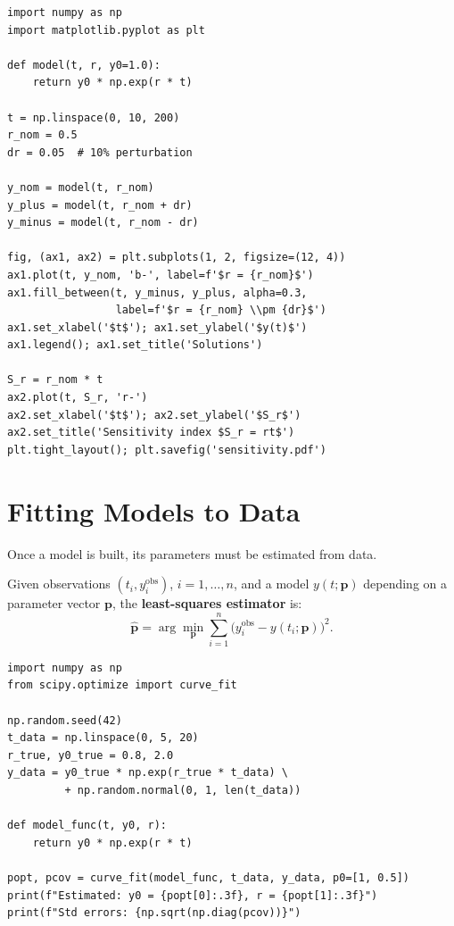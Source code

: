 \begin{codeblock}[title=\textbf{Sensitivity analysis in Python}]
\begin{verbatim}
import numpy as np
import matplotlib.pyplot as plt

def model(t, r, y0=1.0):
    return y0 * np.exp(r * t)

t = np.linspace(0, 10, 200)
r_nom = 0.5
dr = 0.05  # 10% perturbation

y_nom = model(t, r_nom)
y_plus = model(t, r_nom + dr)
y_minus = model(t, r_nom - dr)

fig, (ax1, ax2) = plt.subplots(1, 2, figsize=(12, 4))
ax1.plot(t, y_nom, 'b-', label=f'$r = {r_nom}$')
ax1.fill_between(t, y_minus, y_plus, alpha=0.3,
                 label=f'$r = {r_nom} \\pm {dr}$')
ax1.set_xlabel('$t$'); ax1.set_ylabel('$y(t)$')
ax1.legend(); ax1.set_title('Solutions')

S_r = r_nom * t
ax2.plot(t, S_r, 'r-')
ax2.set_xlabel('$t$'); ax2.set_ylabel('$S_r$')
ax2.set_title('Sensitivity index $S_r = rt$')
plt.tight_layout(); plt.savefig('sensitivity.pdf')
\end{verbatim}
\end{codeblock}

\section{Fitting Models to Data}
\label{sec:fitting}

Once a model is built, its parameters must be estimated from data.

\begin{definition}
Given observations $(t_i, y_i^{\mathrm{obs}})$, $i=1,\ldots,n$, and a
model $y(t;\mathbf{p})$ depending on a parameter vector $\mathbf{p}$,
the \textbf{least-squares estimator} is:
\[
  \hat{\mathbf{p}} = \arg\min_{\mathbf{p}}
    \sum_{i=1}^{n} \bigl(y_i^{\mathrm{obs}} - y(t_i;\mathbf{p})\bigr)^2.
\]
\end{definition}

\begin{codeblock}[title=\textbf{Least-squares fitting}]
\begin{verbatim}
import numpy as np
from scipy.optimize import curve_fit

np.random.seed(42)
t_data = np.linspace(0, 5, 20)
r_true, y0_true = 0.8, 2.0
y_data = y0_true * np.exp(r_true * t_data) \
         + np.random.normal(0, 1, len(t_data))

def model_func(t, y0, r):
    return y0 * np.exp(r * t)

popt, pcov = curve_fit(model_func, t_data, y_data, p0=[1, 0.5])
print(f"Estimated: y0 = {popt[0]:.3f}, r = {popt[1]:.3f}")
print(f"Std errors: {np.sqrt(np.diag(pcov))}")
\end{verbatim}
\end{codeblock}


